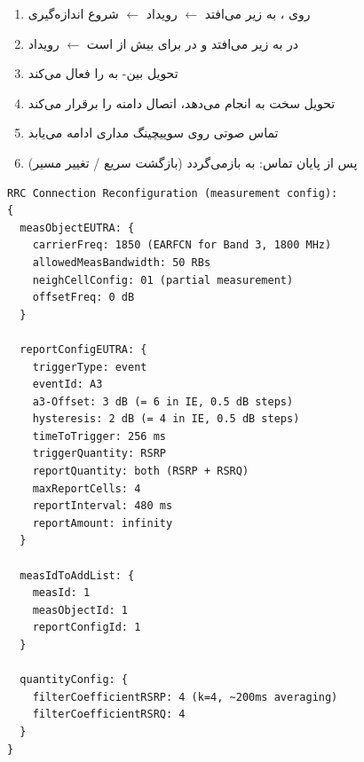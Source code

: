 
\begin{enumerate}
\def\labelenumi{\arabic{enumi}.}
\tightlist
\item
   روی ،  به زیر  می‌افتد \ensuremath{\leftarrow} رویداد  \ensuremath{\leftarrow} شروع اندازه‌گیری 
\item
   در  به زیر  می‌افتد و  در  برای  بیش از  است \ensuremath{\leftarrow} رویداد 
\item
   تحویل بین- به  را فعال می‌کند
\item
   تحویل سخت به  انجام می‌دهد، اتصال دامنه  را برقرار می‌کند
\item
  تماس صوتی روی  سوییچینگ مداری ادامه می‌یابد
\item
  پس از پایان تماس:  به  بازمی‌گردد (بازگشت سریع /\allowbreak{} تغییر مسیر)
\end{enumerate}



\CNchained{}

\def\CNcodelang{}

\begin{CNplaincode}
\begin{Verbatim}
RRC Connection Reconfiguration (measurement config):
{
  measObjectEUTRA: {
    carrierFreq: 1850 (EARFCN for Band 3, 1800 MHz)
    allowedMeasBandwidth: 50 RBs
    neighCellConfig: 01 (partial measurement)
    offsetFreq: 0 dB
  }
  
  reportConfigEUTRA: {
    triggerType: event
    eventId: A3
    a3-Offset: 3 dB (= 6 in IE, 0.5 dB steps)
    hysteresis: 2 dB (= 4 in IE, 0.5 dB steps)
    timeToTrigger: 256 ms
    triggerQuantity: RSRP
    reportQuantity: both (RSRP + RSRQ)
    maxReportCells: 4
    reportInterval: 480 ms
    reportAmount: infinity
  }
  
  measIdToAddList: {
    measId: 1
    measObjectId: 1
    reportConfigId: 1
  }
  
  quantityConfig: {
    filterCoefficientRSRP: 4 (k=4, ~200ms averaging)
    filterCoefficientRSRQ: 4
  }
}
\end{Verbatim}
\end{CNplaincode}

